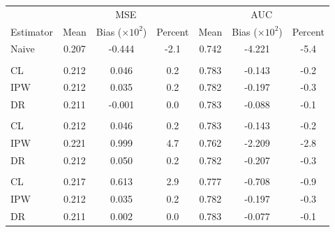 \begin{table}[t]
\begin{threeparttable}
    \begin{tabular}{lcccccc}
    \toprule
    \multicolumn{1}{c}{ } & \multicolumn{3}{c}{MSE} & \multicolumn{3}{c}{AUC} \\
    \cmidrule(l{3pt}r{3pt}){2-4} \cmidrule(l{3pt}r{3pt}){5-7}
    Estimator & Mean & Bias ($\times 10^2$) & Percent & Mean & Bias ($\times 10^2$) & Percent\\
    \midrule
    Naive & 0.207 & -0.444 & -2.1 & 0.742 & -4.221 & -5.4\\
    \addlinespace[0.3em]
    \multicolumn{7}{l}{Correct}\\
    \hspace{1em}CL & 0.212 & 0.046 & 0.2 & 0.783 & -0.143 & \vphantom{1} -0.2\\
    \hspace{1em}IPW & 0.212 & 0.035 & 0.2 & 0.782 & -0.197 & \vphantom{1} -0.3\\
    \hspace{1em}DR & 0.211 & -0.001 & 0.0 & 0.783 & -0.088 & -0.1\\
    \addlinespace[0.3em]
    \multicolumn{7}{l}{$e_a(X)$ misspecified}\\
    \hspace{1em}CL & 0.212 & 0.046 & 0.2 & 0.783 & -0.143 & -0.2\\
    \hspace{1em}IPW & 0.221 & 0.999 & 4.7 & 0.762 & -2.209 & -2.8\\
    \hspace{1em}DR & 0.212 & 0.050 & 0.2 & 0.782 & -0.207 & -0.3\\
    \addlinespace[0.3em]
    \multicolumn{7}{l}{$h_a(X)$ misspecified}\\
    \hspace{1em}CL & 0.217 & 0.613 & 2.9 & 0.777 & -0.708 & -0.9\\
    \hspace{1em}IPW & 0.212 & 0.035 & 0.2 & 0.782 & -0.197 & -0.3\\
    \hspace{1em}DR & 0.211 & 0.002 & 0.0 & 0.783 & -0.077 & -0.1\\

\end{tabular}
\end{threeparttable}
\end{table}

